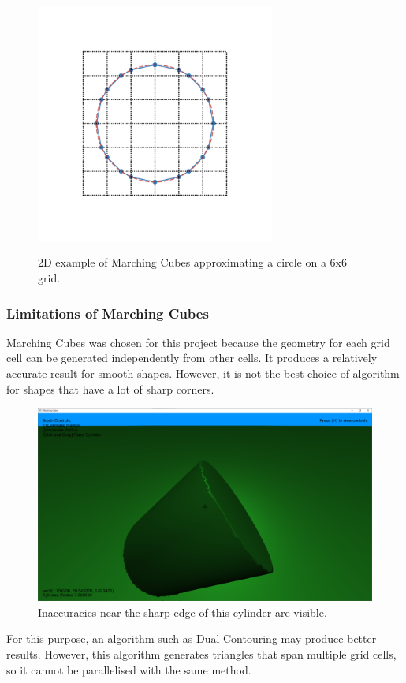 \documentclass[11pt]{article}
\begin{document}
\begin{figure}[H]
  \caption{2D example of Marching Cubes approximating a circle on a 6x6 grid.}
  \includegraphics[width=0.7\textwidth]{ms_example.png}
  \label{fig:ms_example}
\end{figure}

\subsubsection{Limitations of Marching Cubes}
Marching Cubes was chosen for this project because the geometry for each grid cell can be generated independently from other cells. It produces a relatively accurate result for smooth shapes. However, it is not the best choice of algorithm for shapes that have a lot of sharp corners.
\begin{figure}[H]
  \includegraphics[width=\textwidth]{mc_cylinder.png}
  \caption{Inaccuracies near the sharp edge of this cylinder are visible.}
\end{figure}
For this purpose, an algorithm such as Dual Contouring\cite{10.1145/566654.566586} may produce better results. However, this algorithm generates triangles that span multiple grid cells, so it cannot be parallelised with the same method.
\end{document}
